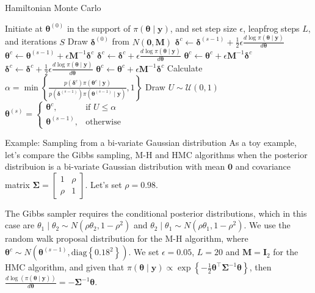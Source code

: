 \documentclass[12pt, compress]{beamer}
\begin{document}
\begin{frame}{Hamiltonian Monte Carlo}
		\begin{algorithm}[H]
			{\tiny{
		\caption{Hamiltonian Monte Carlo}\label{Alg:HMC}	
		\begin{algorithmic}[1]
			\State Initiate at $\bm{\theta}^{(0)}$ in the support of $\pi(\bm{\theta}\mid \bm{y})$, and set step size $\epsilon$, leapfrog steps $L$, and iterations $S$
			\State Draw $\bm{\delta}^{(0)}$ from $N(\bm{0}, \bm{M})$
			\State $\bm{\delta}^c \gets \bm{\delta}^{(s-1)} + \frac{1}{2}\epsilon \frac{d \log \pi(\bm{\theta} \mid \bm{y})}{d \bm{\theta}}$
			\State $\bm{\theta}^c \gets \bm{\theta}^{(s-1)} + \epsilon \bm{M}^{-1} \bm{\delta}^c$
			\State $\bm{\delta}^c \gets \bm{\delta}^c + \epsilon \frac{d \log \pi(\bm{\theta} \mid \bm{y})}{d \bm{\theta}}$
			\State $\bm{\theta}^c \gets \bm{\theta}^c + \epsilon \bm{M}^{-1} \bm{\delta}^c$
			\Else
			\State $\bm{\delta}^c \gets \bm{\delta}^c + \frac{1}{2}\epsilon \frac{d \log \pi(\bm{\theta} \mid \bm{y})}{d \bm{\theta}}$
			\State $\bm{\theta}^c \gets \bm{\theta}^c + \epsilon \bm{M}^{-1} \bm{\delta}^c$
			\EndIf
			\EndFor
			\State Calculate $\alpha = \min\left\{ \frac{p(\bm{\delta}^c) \pi(\bm{\theta}^c \mid \bm{y})}{p(\bm{\delta}^{(s-1)}) \pi(\bm{\theta}^{(s-1)} \mid \bm{y})}, 1 \right\}$
			\State Draw $U \sim \mathcal{U}(0,1)$
			\State $\bm{\theta}^{(s)} = 
			\begin{cases}
				\bm{\theta}^c, & \text{if } U \leq \alpha \\
				\bm{\theta}^{(s-1)}, & \text{otherwise}
			\end{cases}$
			\EndFor
		\end{algorithmic}
	}}
	\end{algorithm}
\end{frame}


\begin{frame}{Example: Sampling from a bi-variate Gaussian distribution}
	As a toy example, let's compare the Gibbs sampling, M-H and HMC algorithms when the posterior distribuion is a bi-variate Gaussian distribution with mean $\bm{0}$ and covariance matrix $\bm{\Sigma}=\begin{bmatrix}
		1 & \rho \\
		\rho & 1
	\end{bmatrix}$. Let's set $\rho= 0.98$.
	
	The Gibbs sampler requires the conditional posterior distributions, which in this case are $\theta_1\mid \theta_2\sim N(\rho\theta_2,1-\rho^2)$ and $\theta_2\mid \theta_1\sim N(\rho\theta_1,1-\rho^2)$. We use the random walk proposal distribution for the M-H algorithm, where $\bm{\theta}^c\sim N(\bm{\theta}^{(s-1)}, \text{diag}\left\{0.18^2\right\})$. We set $\epsilon=0.05$, $L=20$ and $\bm{M}=\bm{I}_2$ for the HMC algorithm, and given that $\pi(\bm{\theta}\mid \bm{y})\propto \exp\left\{-\frac{1}{2}\bm{\theta}^{\top}\bm{\Sigma}^{-1}\bm{\theta}\right\}$, then $\frac{d\log(\pi(\bm{\theta}\mid \bm{y}))}{d\bm{\theta}}=-\bm{\Sigma}^{-1}\bm{\theta}$.
\end{frame}
\end{document}

